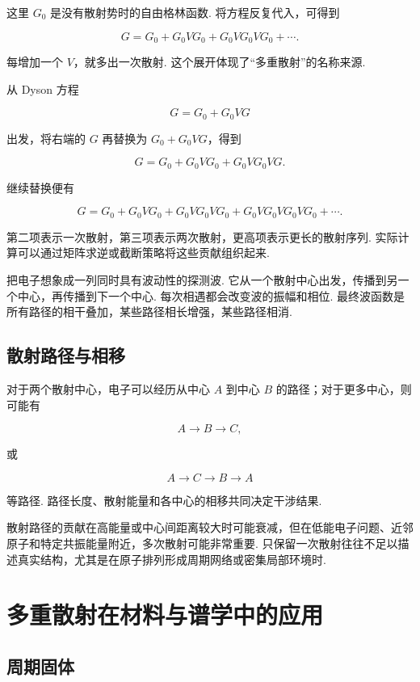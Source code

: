 \documentclass[UTF8,11pt,a4paper,openany]{ctexbook}
\begin{document}
这里 $G_0$ 是没有散射势时的自由格林函数. 将方程反复代入，可得到

\[
G
=
G_0
+
G_0VG_0
+
G_0VG_0VG_0+\cdots.
\]

每增加一个 $V$，就多出一次散射. 这个展开体现了“多重散射”的名称来源. 

\begin{derivationbox}
从 Dyson 方程

\[
G=G_0+G_0VG
\]

出发，将右端的 $G$ 再替换为 $G_0+G_0VG$，得到

\[
G
=
G_0+G_0VG_0+G_0VG_0VG.
\]

继续替换便有

\[
G
=
G_0+G_0VG_0+G_0VG_0VG_0
+G_0VG_0VG_0VG_0+\cdots.
\]

第二项表示一次散射，第三项表示两次散射，更高项表示更长的散射序列. 实际计算可以通过矩阵求逆或截断策略将这些贡献组织起来. 
\end{derivationbox}

\begin{analogybox}
把电子想象成一列同时具有波动性的探测波. 它从一个散射中心出发，传播到另一个中心，再传播到下一个中心. 每次相遇都会改变波的振幅和相位. 最终波函数是所有路径的相干叠加，某些路径相长增强，某些路径相消. 
\end{analogybox}

\subsection{散射路径与相移}

对于两个散射中心，电子可以经历从中心 $A$ 到中心 $B$ 的路径；对于更多中心，则可能有

\[
A\longrightarrow B\longrightarrow C,
\]

或

\[
A\longrightarrow C\longrightarrow B\longrightarrow A
\]

等路径. 路径长度、散射能量和各中心的相移共同决定干涉结果. 

散射路径的贡献在高能量或中心间距离较大时可能衰减，但在低能电子问题、近邻原子和特定共振能量附近，多次散射可能非常重要. 只保留一次散射往往不足以描述真实结构，尤其是在原子排列形成周期网络或密集局部环境时. 

\section{多重散射在材料与谱学中的应用}

\subsection{周期固体}
\end{document}
